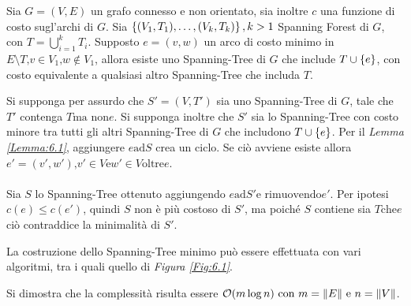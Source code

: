 \documentclass{subfiles}
\begin{document}
\begin{Lemma}
    Sia \(G =(V, E)\) un grafo connesso e non orientato, sia inoltre \(c\) una funzione di costo sugl'archi di \(G\).
    Sia \(\left\{(V_{1}, T_{1}), \ldots, (V_{k}, T_{k})\right\}, k > 1\) Spanning Forest di \(G\), con \(T = \bigcup_{i = 1}^{k}{T_{i}}\).
    Supposto \(e = (v, w)\) un arco di costo minimo in \(E \setminus T \text{,} v \in V_{1} \text{,} w \notin V_{1}\),
    allora esiste uno Spanning-Tree di \(G\) che include \(T \cup \left\{e\right\}\), con costo equivalente a qualsiasi altro Spanning-Tree che includa \(T\).

    \begin{Proof*}
        Si supponga per assurdo che \(S' = (V, T')\) sia uno Spanning-Tree di \(G\), tale che \(T'\) contenga \(T \text{ma non} e\).
        Si supponga inoltre che \(S'\) sia lo Spanning-Tree con costo minore tra tutti gli altri Spanning-Tree di \(G\) che includono \(T \cup \left\{e\right\}\).
        Per il \emph{Lemma \ref{Lemma:6.1}}, aggiungere \(e \text{ad} S\) crea un ciclo.
        Se ciò avviene esiste allora \(e' = (v', w') \text{,} v' \in V \text{e} w' \in V \text{oltre} e\).
        \\ \\
        Sia \(S\) lo Spanning-Tree ottenuto aggiungendo \(e \text{ad} S' \text{e rimuovendo} e'\). Per ipotesi \(c(e) \le c(e')\), quindi \(S\) non è più costoso di \(S'\),
        ma poiché \(S\) contiene sia \(T \text{che} e\) ciò contraddice la minimalità di \(S'\).
    \end{Proof*}
\end{Lemma}

\noindent La costruzione dello Spanning-Tree minimo può essere effettuata con vari algoritmi, tra i quali quello di \emph{Figura \ref{Fig:6.1}}.


\noindent Si dimostra che la complessità risulta essere \(\order{m \log n} \text{con} m = \norm{E} \text{e} n = \norm{V}\).
\end{document}
